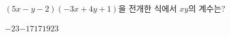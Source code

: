 $(5x-y-2)(-3x+4y+1)$을 전개한 식에서 $xy$의 계수는?
\begin{choices32}{$-23$}{$-17$}{$17$}{$19$}{$23$}\end{choices32}

